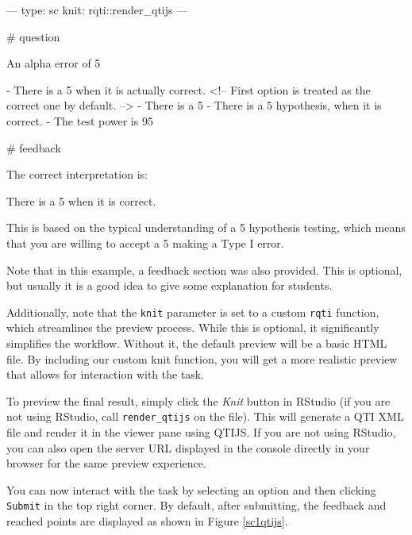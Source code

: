 \documentclass[twoside]{tufte-book}
\newenvironment{Shaded}{}{}
\begin{document}
\begin{Shaded}
\begin{Highlighting}
---
type: sc
knit: rqti::render_qtijs
---

# question

An alpha error of 5% means that:

- There is a 5% probability that you will mistakenly reject the null hypothesis,
when it is actually correct. <!-- First option is treated as the correct one by
default. -->
- There is a 5% probability that the null hypothesis is correct.
- There is a 5% probability that you will mistakenly reject the alternative
hypothesis, when it is correct.
- The test power is 95%.

# feedback

The correct interpretation is:

There is a 5% probability that you will mistakenly reject the null hypothesis,
when it is correct.

This is based on the typical understanding of a 5% significance level in
hypothesis testing, which means that you are willing to accept a 5% chance of
making a Type I error.
\end{Highlighting}
\end{Shaded}

Note that in this example, a feedback section was also provided. This is optional, but usually it is a good idea to give some explanation for students.

Additionally, note that the \texttt{knit} parameter is set to a custom \texttt{rqti} function, which streamlines the preview process. While this is optional, it significantly simplifies the workflow. Without it, the default preview will be a basic HTML file. By including our custom knit function, you will get a more realistic preview that allows for interaction with the task.

To preview the final result, simply click the \emph{Knit} button in RStudio (if you are not using RStudio, call \texttt{render\_qtijs} on the file). This will generate a QTI XML file and render it in the viewer pane using QTIJS. If you are not using RStudio, you can also open the server URL displayed in the console directly in your browser for the same preview experience.

You can now interact with the task by selecting an option and then clicking \texttt{Submit} in the top right corner. By default, after submitting, the feedback and reached points are displayed as shown in Figure \ref{sc1qtijs}.
\end{document}
